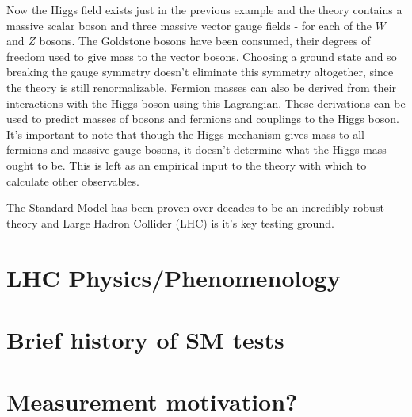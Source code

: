 Now the Higgs field exists just in the previous example and the theory contains a massive scalar boson and three massive vector gauge fields - for each of the $W$ and $Z$ bosons. The Goldstone bosons have been consumed, their degrees of freedom used to give mass to the vector bosons. Choosing a ground state and so breaking the gauge symmetry doesn't eliminate this symmetry altogether, since the theory is still renormalizable. Fermion masses can also be derived from their interactions with the Higgs boson using this Lagrangian. These derivations can be used to predict masses of bosons and fermions and couplings to the Higgs boson. It's important to note that though the Higgs mechanism gives mass to all fermions and massive gauge bosons, it doesn't determine what the Higgs mass ought to be. This is left as an empirical input to the theory with which to calculate other observables. 

The Standard Model has been proven over decades to be an incredibly robust theory and Large Hadron Collider (LHC) is it's key testing ground. 

\section{LHC Physics/Phenomenology}
\section{Brief history of SM tests}
\section{Measurement motivation?}

